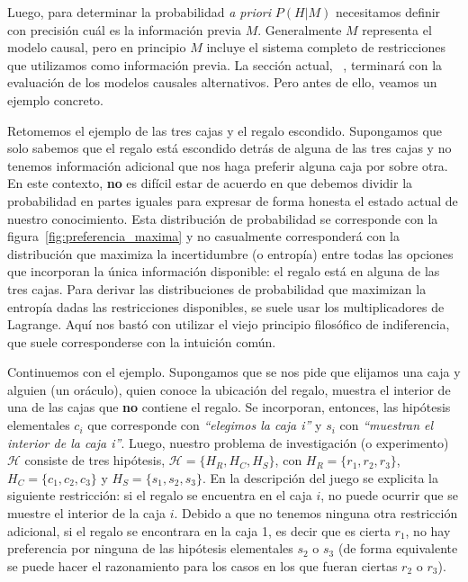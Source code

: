 \documentclass[a4paper,11pt]{book}
\theoremstyle{definition}
\begin{document}
%
Luego, para determinar la probabilidad \emph{a priori} $P(H|M)$ necesitamos definir con precisi\'on cu\'al es la informaci\'on previa $M$.
%
Generalmente $M$ representa el modelo causal, pero en principio $M$ incluye el sistema completo de restricciones que utilizamos como informaci\'on previa.
%
La secci\'on actual,~ \emph{}, terminar\'a con la evaluaci\'on de los modelos causales alternativos.
%
Pero antes de ello, veamos un ejemplo concreto.


Retomemos el ejemplo de las tres cajas y el regalo escondido.
Supongamos que solo sabemos que el regalo est\'a escondido detr\'as de alguna de las tres cajas y no tenemos informaci\'on adicional que nos haga preferir alguna caja por sobre otra.
%
En este contexto, \textbf{no} es dif\'icil estar de acuerdo en que debemos dividir la probabilidad en partes iguales para expresar de forma honesta el estado actual de nuestro conocimiento.
%
Esta distribuci\'on de probabilidad se corresponde con la figura~\ref{fig:preferencia_maxima} y no casualmente corresponder\'a con la distribuci\'on que maximiza la incertidumbre (o entrop\'ia) entre todas las opciones que incorporan la \'unica informaci\'on disponible: el regalo est\'a en alguna de las tres cajas.
%
Para derivar las distribuciones de probabilidad que maximizan la entrop\'ia dadas las restricciones disponibles, se suele usar los multiplicadores de Lagrange.
%
Aqu\'i nos bast\'o con utilizar el viejo principio filos\'ofico de indiferencia, que suele corresponderse con la intuici\'on com\'un.


Continuemos con el ejemplo.
%
Supongamos que se nos pide que elijamos una caja y alguien (un or\'aculo), quien conoce la ubicaci\'on del regalo, muestra el interior de una de las cajas que \textbf{no} contiene el regalo.
%
Se incorporan, entonces, las hip\'otesis elementales $c_i$ que corresponde con \emph{``elegimos la caja i''} y $s_i$ con \emph{``muestran el interior de la caja i''}.
%
Luego, nuestro problema de investigaci\'on (o experimento) $\mathcal{H}$ consiste de tres hip\'otesis, $\mathcal{H} = \{H_R, H_C, H_S\}$, con $H_R=\{r_1, r_2, r_3\}$, $H_C=\{c_1, c_2, c_3\}$ y $H_S=\{s_1, s_2, s_3\}$.
%
En la descripci\'on del juego se explicita la siguiente restricci\'on: si el regalo se encuentra en el caja $i$, no puede ocurrir que se muestre el interior de la caja $i$.
%
Debido a que no tenemos ninguna otra restricci\'on adicional, si el regalo se encontrara en la caja 1, es decir que es cierta $r_1$, no hay preferencia por ninguna de las hip\'otesis elementales $s_2$ o $s_3$ (de forma equivalente se puede hacer el razonamiento para los casos en los que fueran ciertas $r_2$ o $r_3$).
\end{document}
